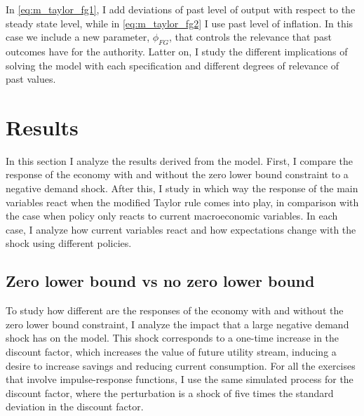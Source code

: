 \documentclass[12pt]{article}
\numberwithin{equation}{section}
\begin{document}
In \eqref{eq:m_taylor_fg1}, I add deviations of past level of output with respect to the steady state level, while in \eqref{eq:m_taylor_fg2} I use past level of inflation. In this case we include a new parameter, $\phi_{FG}$, that controls the relevance that past outcomes have for the authority. Latter on, I study the different implications of solving the model with each specification and different degrees of relevance of past values.

\section{Results}\label{sec:results}

In this section I analyze the results derived from the model. First, I compare the response of the economy with and without the zero lower bound constraint to a negative demand shock. After this, I study in which way the response of the main variables react when the modified Taylor rule comes into play, in comparison with the case when policy only reacts to current macroeconomic variables. In each case, I analyze how current variables react and how expectations change with the shock using different policies.

\subsection{Zero lower bound vs no zero lower bound}

To study how different are the responses of the economy with and without the zero lower bound constraint, I analyze the impact that a large negative demand shock has on the model. This shock corresponds to a one-time increase in the discount factor, which increases the value of future utility stream, inducing a desire to increase savings and reducing current consumption. For all the exercises that involve impulse-response functions, I use the same simulated process for the discount factor, where the perturbation is a shock of five times the standard deviation in the discount factor.
\end{document}
